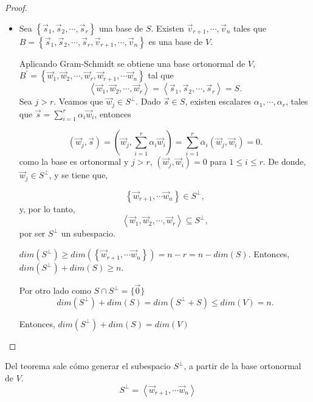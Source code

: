 {\begin{theorem}
\begin{proof}
\begin{itemize}
  \bigskip
     \item 
   Sea $\left\{\vec{s}_1,\vec{s}_2,\cdots,\vec{s}_r\right\}$ una base de $S$. Existen 
   $\vec{v}_{r+1}, \cdots,\vec{v}_n$ tales que \\ $B=\left \{\vec{s}_1,\vec{s}_2,\cdots,\vec{s}_r,\vec{v}_{r+1}, \cdots,\vec{v}_n \right \}$ es una base de $V$. 
   
   Aplicando Gram-Schmidt se obtiene una base ortonormal  de $V$, 
    $B^\prime=\left\{\vec{w}_1,\vec{w}_2,\cdots,\vec{w}_r,\vec{w}_{r+1}, \cdots\vec{w}_n\right\}$ tal que  $$\left\langle \vec{w}_1,\vec{w}_2,\cdots, \vec{w}_r \right\rangle  = \left\langle \vec{s}_1,\vec{s}_2,\cdots, \vec{s}_r \right\rangle=S.$$
    Sea $j > r$. Veamos que $\vec{w}_j \in S^{\perp}$.
    Dado $\vec{s} \in S$, existen escalares $\alpha_1,\cdots,\alpha_r$, tales que $\vec{s}=\sum_{i=1}^r \alpha_i \vec{w}_i  $, entonces
    
    
    $$(\vec{w}_j, \vec{s})=(\vec{w}_j,\sum_{i=1}^r \alpha_i \vec{w}_i)= \sum_{i=1}^r \overline \alpha_i ( \vec{w}_j, \vec{w}_i) =0.$$
    \noindent
    como la base es ortonormal  y $j > r$, $( \vec{w}_j, \vec{w}_i)=0$  para $1 \le i \le r$.
    De donde, $\vec{w}_j \in S^{\perp}$, y se tiene que, 
    
    $$\left\{\vec{w}_{r+1}, \cdots\vec{w}_n\right\}\in S^{\perp},$$ y, por lo tanto, 
    $$\left\langle \vec{w}_1,\vec{w}_2,\cdots, \vec{w}_r \right\rangle \subseteq S^{\perp},$$ por ser $S^{\perp}$ un subespacio. 
    
     \bigskip
     
    $dim (S^{\perp})   \ge dim (\left\{\vec{w}_{r+1}, \cdots\vec{w}_n\right\})=n-r=n-dim(S)$.
     \bigskip
    Entonces,  $dim (S^{\perp})+ dim(S)   \ge n$.
    
     \bigskip 
    Por otro lado como $S \cap S^{\perp} =\{\vec{0}\}$
    $$dim (S^{\perp})+ dim(S)= dim(S^{\perp}+ S) \le dim(V) = n.$$
    
       Entonces, $dim (S^{\perp})+ dim(S)=dim(V)$
    
\end{itemize}

\end{proof}
\end{theorem}


\bigskip

\begin{remark}
Del teorema sale cómo generar  el subespacio $S^{\perp}$, a partir de la base ortonormal de $V$.  $$S^{\perp}=\left\langle\vec{w}_{r+1}, \cdots\vec{w}_n\right\rangle$$
\end{remark}

}
